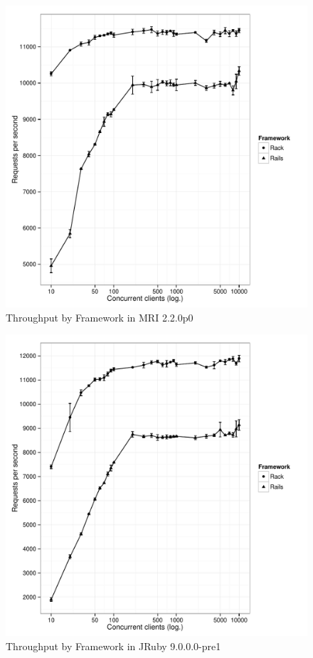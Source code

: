 	\begin{figure}[H]
		\begin{center}
			\includegraphics[width=\textwidth]{images/throughput-frameworks-mri22.pdf}
		\end{center}
		\caption{Throughput by Framework in \ac{MRI} 2.2.0p0}
		\label{img:rawdata:throughput-frameworks-mri22}
	\end{figure}

	\begin{figure}[H]
		\begin{center}
			\includegraphics[width=\textwidth]{images/throughput-frameworks-jruby9.pdf}
		\end{center}
		\caption{Throughput by Framework in JRuby 9.0.0.0-pre1}
		\label{img:rawdata:throughput-frameworks-jruby9}
	\end{figure}

